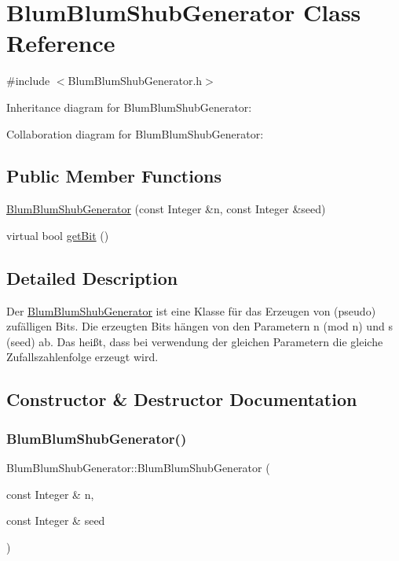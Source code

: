 \hypertarget{classBlumBlumShubGenerator}{}\section{Blum\+Blum\+Shub\+Generator Class Reference}
\label{classBlumBlumShubGenerator}


{\ttfamily \#include $<$Blum\+Blum\+Shub\+Generator.\+h$>$}



Inheritance diagram for Blum\+Blum\+Shub\+Generator\+:


Collaboration diagram for Blum\+Blum\+Shub\+Generator\+:
\subsection*{Public Member Functions}
\begin{DoxyCompactItemize}
\item 
\hyperlink{classBlumBlumShubGenerator_ae4bb31e199365075f38783d82f5dd74f}{Blum\+Blum\+Shub\+Generator} (const Integer \&n, const Integer \&seed)
\item 
virtual bool \hyperlink{classBlumBlumShubGenerator_aa25d1b6bc4686e6fecd254877b472d39}{get\+Bit} ()
\end{DoxyCompactItemize}


\subsection{Detailed Description}
Der \hyperlink{classBlumBlumShubGenerator}{Blum\+Blum\+Shub\+Generator} ist eine Klasse für das Erzeugen von (pseudo) zufälligen Bits. Die erzeugten Bits hängen von den Parametern n (mod n) und s (seed) ab. Das heißt, dass bei verwendung der gleichen Parametern die gleiche Zufallszahlenfolge erzeugt wird. 

\subsection{Constructor \& Destructor Documentation}
\mbox{\label{classBlumBlumShubGenerator_ae4bb31e199365075f38783d82f5dd74f}} 
\subsubsection{\texorpdfstring{Blum\+Blum\+Shub\+Generator()}{BlumBlumShubGenerator()}}
{\footnotesize\ttfamily Blum\+Blum\+Shub\+Generator\+::\+Blum\+Blum\+Shub\+Generator (\begin{DoxyParamCaption}\item[{const Integer \&}]{n,  }\item[{const Integer \&}]{seed }\end{DoxyParamCaption})}

